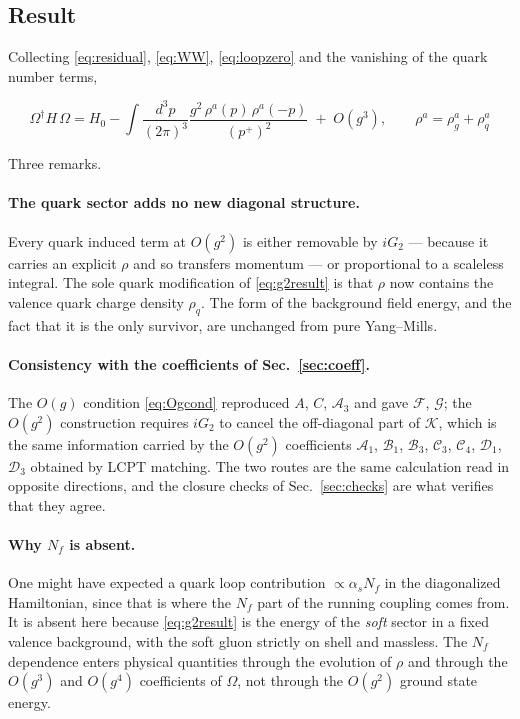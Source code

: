 \documentclass[11pt]{article}
\newcommand{\dg}{\dagger}
\newcommand{\ip}[1]{\int\!\frac{d^{3}#1}{(2\pi)^{3}}}
\newcommand{\OM}{\Omega}
\newcommand{\A}{\mathcal{A}}
\newcommand{\B}{\mathcal{B}}
\newcommand{\C}{\mathcal{C}}
\newcommand{\D}{\mathcal{D}}
\begin{document}
\subsection{Result}

Collecting \eqref{eq:residual}, \eqref{eq:WW}, \eqref{eq:loopzero} and the vanishing of the quark
number terms,
\begin{res}
\begin{equation}
\boxed{\;
\OM^{\dg}H\,\OM=H_{0}-\ip{p}\frac{g^{2}\,\rho^{a}(p)\,\rho^{a}(-p)}{(p^{+})^{2}}
\;+\;O(g^{3}),\qquad \rho^{a}=\rho^{a}_{g}+\rho^{a}_{q}\;}
\label{eq:g2result}
\end{equation}
\end{res}

\noindent
Three remarks.

\paragraph{The quark sector adds no new diagonal structure.} Every quark induced term at
$O(g^{2})$ is either removable by $iG_{2}$ --- because it carries an explicit $\rho$ and so
transfers momentum --- or proportional to a scaleless integral. The sole quark modification of
\eqref{eq:g2result} is that $\rho$ now contains the valence quark charge density $\rho_{q}$. The
form of the background field energy, and the fact that it is the only survivor, are unchanged
from pure Yang--Mills.

\paragraph{Consistency with the coefficients of Sec.~\ref{sec:coeff}.} The $O(g)$ condition
\eqref{eq:Ogcond} reproduced $A$, $C$, $\A_{3}$ and gave $\mathcal F$, $\mathcal G$; the $O(g^{2})$
construction requires $iG_{2}$ to cancel the off-diagonal part of $\mathcal K$, which is the
same information carried by the $O(g^{2})$ coefficients $\A_{1}$, $\B_{1}$, $\B_{3}$, $\C_{3}$,
$\C_{4}$, $\D_{1}$, $\D_{3}$ obtained by LCPT matching. The two routes are the same calculation
read in opposite directions, and the closure checks of Sec.~\ref{sec:checks} are what verifies
that they agree.

\paragraph{Why $N_{f}$ is absent.} One might have expected a quark loop contribution
$\propto\alpha_{s}N_{f}$ in the diagonalized Hamiltonian, since that is where the $N_{f}$ part of
the running coupling comes from. It is absent here because \eqref{eq:g2result} is the energy of
the \emph{soft} sector in a fixed valence background, with the soft gluon strictly on shell and
massless. The $N_{f}$ dependence enters physical quantities through the evolution of
$\rho$ and through the $O(g^{3})$ and $O(g^{4})$ coefficients of $\OM$, not through the
$O(g^{2})$ ground state energy.
\end{document}
